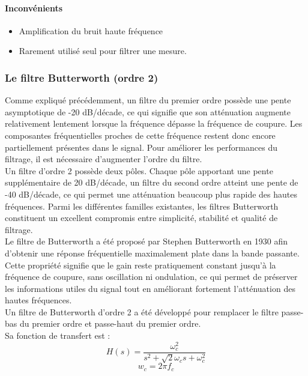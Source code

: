 \paragraph{Inconvénients}

\begin{itemize}
    \item Amplification du bruit haute fréquence
    \item Rarement utilisé seul pour filtrer une mesure.
\end{itemize}

\subsubsection{Le filtre Butterworth (ordre 2)}
\label{sec:filtre_butterworth}

Comme expliqué précédemment, un filtre du premier ordre possède une pente asymptotique de -20 dB/décade, ce qui signifie que son atténuation augmente relativement lentement lorsque la fréquence dépasse la fréquence de coupure. Les composantes fréquentielles proches de cette fréquence restent donc encore partiellement présentes dans le signal. Pour améliorer les performances du filtrage, il est nécessaire d'augmenter l'ordre du filtre. \\

Un filtre d'ordre 2 possède deux pôles. Chaque pôle apportant une pente supplémentaire de 20 dB/décade, un filtre du second ordre atteint une pente de -40 dB/décade, ce qui permet une atténuation beaucoup plus rapide des hautes fréquences. Parmi les différentes familles existantes, les filtres Butterworth constituent un excellent compromis entre simplicité, stabilité et qualité de filtrage. \\

Le filtre de Butterworth a été proposé par Stephen Butterworth en 1930 afin d'obtenir une réponse fréquentielle maximalement plate dans la bande passante. Cette propriété signifie que le gain reste pratiquement constant jusqu'à la fréquence de coupure, sans oscillation ni ondulation, ce qui permet de préserver les informations utiles du signal tout en améliorant fortement l'atténuation des hautes fréquences. \\

Un filtre de Butterworth d'ordre 2 a été développé pour remplacer le filtre passe-bas du premier ordre et passe-haut du premier ordre. \\

Sa fonction de transfert est :
\begin{equation}
    H(s) = \frac{\omega^{2}_{c}}{s^{2} + \sqrt{2}\omega_{c}s + \omega^{2}_{c}}
\end{equation}
\begin{equation}
    w_{c} = 2\pi f_{c}
\end{equation}

